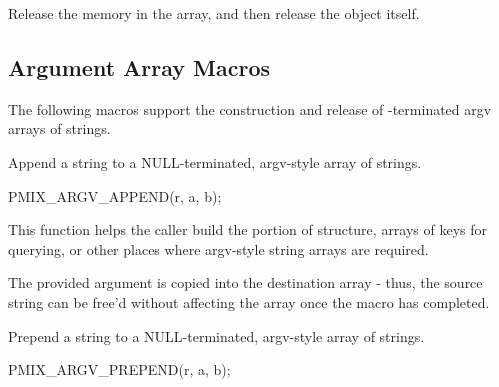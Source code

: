 
Release the memory in the array, and then release the  object itself.


\begin{arglist}
\end{arglist}

\subsection{Argument Array Macros}

The following macros support the construction and release of -terminated argv arrays of strings.


Append a string to a NULL-terminated, argv-style array of strings.

\cspecificstart
\begin{codepar}
PMIX_ARGV_APPEND(r, a, b);
\end{codepar}
\cspecificend

\begin{arglist}
\end{arglist}

This function helps the caller build the  portion of  structure, arrays of keys for querying, or other places where argv-style string arrays are required.

\adviceuserstart
The provided argument is copied into the destination array - thus, the source string can be free'd without affecting the array once the macro has completed.
\adviceuserend


Prepend a string to a NULL-terminated, argv-style array of strings.

\cspecificstart
\begin{codepar}
PMIX_ARGV_PREPEND(r, a, b);
\end{codepar}
\cspecificend

